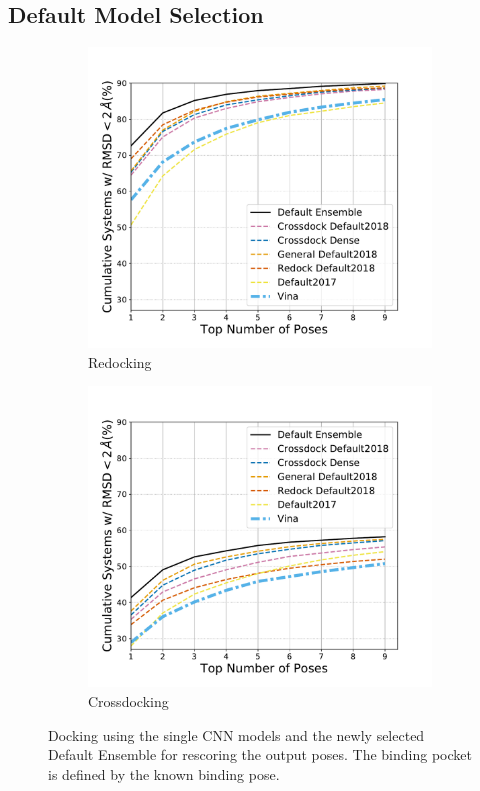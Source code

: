 \documentclass[journal=jcisd8,manuscript=article]{achemso}
\begin{document}
\subsection{Default Model Selection}
\begin{figure}
	\begin{subfigure}[b]{0.48\textwidth}
		\centering
		\includegraphics[width=\textwidth]{figures/redocking/rescore_single_models_line.pdf}
		\caption{Redocking}
		\label{fig:RescoreSingleRedock}
        \end{subfigure}    
	\begin{subfigure}[b]{0.48\textwidth}    
		\centering
		\includegraphics[width=\textwidth]{figures/crossdocking/rescore_single_models_line.pdf}
		\caption{Crossdocking}
		\label{fig:RescoreSingleCrossdock}
        \end{subfigure}    
	\caption{Docking using the single CNN models and the newly selected Default Ensemble for rescoring the output poses. The binding pocket is defined by the known binding pose.}
	\label{fig:RescoreSingle}
\end{figure}    
\end{document}
